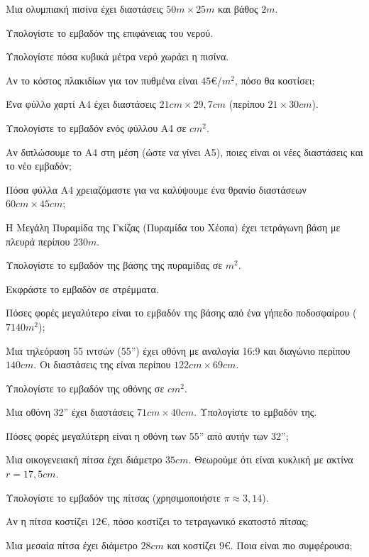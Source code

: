 \documentclass[11pt,a4paper,modern]{FFExercises}
\begin{document}
\askhsh Μια ολυμπιακή πισίνα έχει διαστάσεις $50\si{m}\times 25\si{m}$ και βάθος $2\si{m}$.
\begin{alist}
\item Υπολογίστε το εμβαδόν της επιφάνειας του νερού.
\item Υπολογίστε πόσα κυβικά μέτρα νερό χωράει η πισίνα.
\item Αν το κόστος πλακιδίων για τον πυθμένα είναι $45$\euro/$\si{m^2}$, πόσο θα κοστίσει;
\end{alist}

\askhsh Ένα φύλλο χαρτί A4 έχει διαστάσεις $21\si{cm}\times 29{,}7\si{cm}$ (περίπου $21\times 30\si{cm}$).
\begin{alist}
\item Υπολογίστε το εμβαδόν ενός φύλλου A4 σε $\si{cm^2}$.
\item Αν διπλώσουμε το A4 στη μέση (ώστε να γίνει A5), ποιες είναι οι νέες διαστάσεις και το νέο εμβαδόν;
\item Πόσα φύλλα A4 χρειαζόμαστε για να καλύψουμε ένα θρανίο διαστάσεων $60\si{cm}\times 45\si{cm}$;
\end{alist}

\askhsh Η Μεγάλη Πυραμίδα της Γκίζας (Πυραμίδα του Χέοπα) έχει τετράγωνη βάση με πλευρά περίπου $230\si{m}$.
\begin{alist}
\item Υπολογίστε το εμβαδόν της βάσης της πυραμίδας σε $\si{m^2}$.
\item Εκφράστε το εμβαδόν σε στρέμματα.
\item Πόσες φορές μεγαλύτερο είναι το εμβαδόν της βάσης από ένα γήπεδο ποδοσφαίρου ($7140\si{m^2}$);
\end{alist}

\askhsh Μια τηλεόραση 55 ιντσών (55'') έχει οθόνη με αναλογία 16:9 και διαγώνιο περίπου $140\si{cm}$. Οι διαστάσεις της είναι περίπου $122\si{cm}\times 69\si{cm}$.
\begin{alist}
\item Υπολογίστε το εμβαδόν της οθόνης σε $\si{cm^2}$.
\item Μια οθόνη 32'' έχει διαστάσεις $71\si{cm}\times 40\si{cm}$. Υπολογίστε το εμβαδόν της.
\item Πόσες φορές μεγαλύτερη είναι η οθόνη των 55'' από αυτήν των 32'';
\end{alist}

\askhsh Μια οικογενειακή πίτσα έχει διάμετρο $35\si{cm}$. Θεωρούμε ότι είναι κυκλική με ακτίνα $r=17{,}5\si{cm}$.
\begin{alist}
\item Υπολογίστε το εμβαδόν της πίτσας (χρησιμοποιήστε $\pi\approx 3{,}14$).
\item Αν η πίτσα κοστίζει $12$\euro, πόσο κοστίζει το τετραγωνικό εκατοστό πίτσας;
\item Μια μεσαία πίτσα έχει διάμετρο $28\si{cm}$ και κοστίζει $9$\euro. Ποια είναι πιο συμφέρουσα;
\end{alist}
\end{document}
